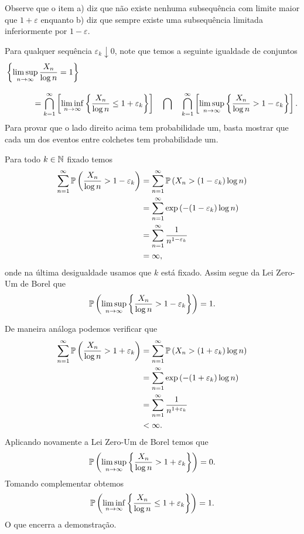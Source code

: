 Observe que o item a) diz que não existe nenhuma 
subsequência com limite maior que $1+\varepsilon$ enquanto
b) diz que sempre existe uma subsequência limitada inferiormente
por $1-\varepsilon$. 




Para qualquer sequência $\varepsilon_k\downarrow 0$, 
note que temos a seguinte igualdade
de conjuntos
\begin{align*}
\left\{ \limsup_{n\to\infty} \frac{X_n}{\log n} =1  \right\}
&
\\[0.3cm]
&
\hspace*{-2cm}
=\bigcap_{k=1}^{\infty}
\left[ 
	\liminf_{n\to\infty} 
		\left\{ 
			\frac{X_n}{\log n} \leq 1+\varepsilon_k 
		\right\}  
\right]
\quad
\bigcap
\quad
\bigcap_{k=1}^{\infty}
\left[ 
	\limsup_{n\to\infty} 
		\left\{ 
			\frac{X_n}{\log n} > 1-\varepsilon_k  
		\right\}  
\right].
\end{align*}
%
%
%
%
Para provar que o lado direito acima tem probabilidade
um, basta mostrar que cada um dos eventos 
entre colchetes tem probabilidade um. 

Para todo $k\in\N$ fixado temos 
\begin{align*}
\sum_{n=1}^{\infty} 
\P\left(  
	\frac{X_n}{\log n} > 1-\varepsilon_k 
\right)
&=
\sum_{n=1}^{\infty} 
\P\left(  
	X_n > (1-\varepsilon_k)\log n  
\right)
\\
&=
\sum_{n=1}^{\infty} 
\exp\left(  
	 -(1-\varepsilon_k)\log n  
\right)
\\
&=
\sum_{n=1}^{\infty} 
\frac{1}{n^{1-\varepsilon_k}}
\\
&=
\infty,
\end{align*}
onde na última desigualdade usamos que $k$ 
está fixado. Assim segue da Lei Zero-Um de Borel
que 
	\[
		\P\left( 
			\limsup_{n\to\infty} 
			\left\{ 
				\frac{X_n}{\log n} > 1-\varepsilon_k  
			\right\}  
		\right)
		=
		1.
	\]

De maneira análoga podemos verificar que
\begin{align*}
\sum_{n=1}^{\infty} 
\P\left(  
	\frac{X_n}{\log n} > 1+\varepsilon_k 
\right)
&=
\sum_{n=1}^{\infty} 
\P\left(  
	X_n > (1+\varepsilon_k)\log n  
\right)
\\
&=
\sum_{n=1}^{\infty} 
\exp\left(  
	 -(1+\varepsilon_k)\log n  
\right)
\\
&=
\sum_{n=1}^{\infty} 
\frac{1}{n^{1+\varepsilon_k}}
\\
&<
\infty.
\end{align*}
Aplicando novamente a Lei Zero-Um de Borel
temos que 
	\[
		\P\left( 
			\limsup_{n\to\infty} 
			\left\{ 
				\frac{X_n}{\log n} > 1+\varepsilon_k  
			\right\}  
		\right)
		=
		0.
	\]
Tomando complementar obtemos 
	\[
		\P\left( 
			\liminf_{n\to\infty} 
			\left\{ 
				\frac{X_n}{\log n} \leq 1+\varepsilon_k  
			\right\}  
		\right)
		=1.
	\]
O que encerra a demonstração.















